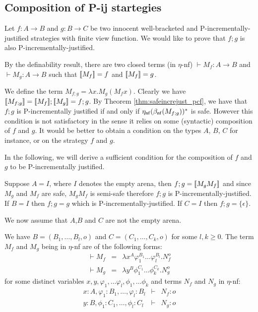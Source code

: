\subsection{Composition of P-ij startegies}

Let $f:A\rightarrow B$ and $g:B\rightarrow C$ be two innocent well-bracketed and P-incrementally-justified strategies with finite view function.
We would like to prove that $f;g$ is also P-incrementally-justified.

By the definability result, there are two closed terms (in $\eta$-nf) $\vdash M_f :A\rightarrow B$  and $\vdash M_g :A\rightarrow B$ such that ${[\![ M_f ]\!]} = f$
and ${[\![ M_f ]\!]} = g$.

We define the term $M_{f;g} = \lambda x . M_g (M_f x)$. Clearly we have ${[\![ M_{f;g} ]\!]} = {[\![ M_f ]\!]} ; {[\![ M_g ]\!]} = f;g$. By Theorem \ref{thm:safeincrejust_pcf}, we have that $f;g$ is P-incrementally justified if and only if $\eta_{\sf nf}(\beta_{\sf nf}(M_{f;g}))^*$ is safe. However this condition is not satisfactory in the sense it relies on some (syntactic) composition of $f$ and $g$. It would be better to obtain a condition on the types $A$, $B$, $C$ for instance, or on the strategy $f$ and $g$.

In the following, we will derive a sufficient condition for the composition of $f$ and $g$ to be P-incrementally justified.


Suppose $A=I$, where $I$ denotes the empty arena, then $f;g = {[\![ M_g M_f ]\!]}$ and since $M_g$ and $M_f$ are safe, $M_g M_f$ is semi-safe therefore $f;g$ is P-incrementally-justified.
If $B=I$ then $f;g = g$ which is P-incrementally-justified.
If $C=I$ then $f;g = \{ \epsilon \}$.

We now assume that $A$,$B$ and $C$ are not the empty arena.

We have $B=(B_1,\ldots,B_l,o)$ and $C=(C_1,\ldots,C_k,o)$ for some $l,k\geq 0$.
The term $M_f$ and $M_g$ being in $\eta$-nf are of the following forms:
\begin{eqnarray*}
\vdash M_f &=& \lambda x^A \varphi_1^{B_1} \ldots \varphi_l^{B_l} . N_f^o\\
\vdash  M_g &=& \lambda y^B \phi_1^{C_1} \ldots \phi_k^{C_k} . N_g^o
\end{eqnarray*}
for some distinct variables $x,y,\varphi_1, \dots \varphi_l, \phi_1, \dots \phi_k$ and
terms $N_f$ and $N_g$ in $\eta$-nf:
\begin{eqnarray*}
x:A, \varphi_1:B_1, \dots, \varphi_l:B_l &\vdash& N_f :o \\
y:B, \phi_1:C_1, \dots, \phi_l:C_l &\vdash& N_g :o
\end{eqnarray*}


